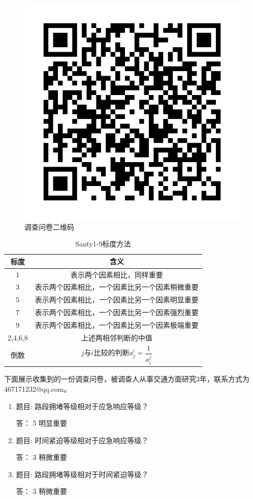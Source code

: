 \begin{figure}[h]
	\centering
	\includegraphics[width=0.3\linewidth]{figures/qrcode}
	\caption{调查问卷二维码}
	\label{fig:qrcode}
\end{figure}

\begin{table}[H]
	\centering
	\caption{Santy1-9标度方法}
	\label{table:santy}
	\begin{tabular}{|c|c|}
		\hline
		标度 & 含义\\
		\hline
		1 &	表示两个因素相比，同样重要 \\ \hline
		3 &	表示两个因素相比，一个因素比另一个因素稍微重要 \\ \hline
		5 &	表示两个因素相比，一个因素比另一个因素明显重要 \\ \hline
		7 &	表示两个因素相比，一个因素比另一个因素强烈重要 \\ \hline
		9 &	表示两个因素相比，一个因素比另一个因素极端重要 \\ \hline
		2,4,6,8 &	上述两相邻判断的中值 \\ \hline
		倒数 &	${j}$与${i}$比较的判断${a_j^i = \dfrac{1}{a_i^j}}$ \\ \hline
	\end{tabular}
\end{table}

下面展示收集到的一份调查问卷，被调查人从事交通方面研究3年，联系方式为467171232@qq.com。

\begin{enumerate}
	\item 题目: 路段拥堵等级相对于应急响应等级？
	
			答：	5 明显重要
	\item 题目: 时间紧迫等级相对于应急响应等级？
	
			答：	3 稍微重要
	\item 题目: 路段拥堵等级相对于时间紧迫等级？
	
			答：	3 稍微重要
\end{enumerate}








